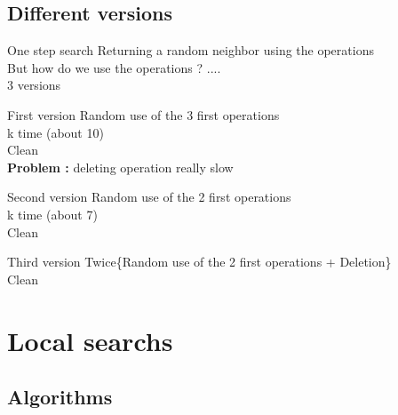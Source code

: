 \documentclass[11pt]{beamer}
\begin{document}
\subsection{Different versions}
\begin{frame}{One step search}
Returning a random neighbor using the operations\\
But how do we use the operations ? ....\\
3 versions
\end{frame}

\begin{frame}

\begin{alertblock}{First version}
Random use of the 3 first operations\\
k time (about 10) \\
Clean\\
\textbf{Problem : } deleting operation really slow
\end{alertblock}
\pause

\pause
\begin{block}{Second version}
Random use of the 2 first operations\\
k time (about 7) \\
Clean
\end{block}
\pause
\begin{block}{Third version}
Twice\{Random use of the 2 first operations + Deletion\} \\
Clean
\end{block}
\end{frame}


\section{Local searchs}

\subsection{Algorithms}
\end{document}
